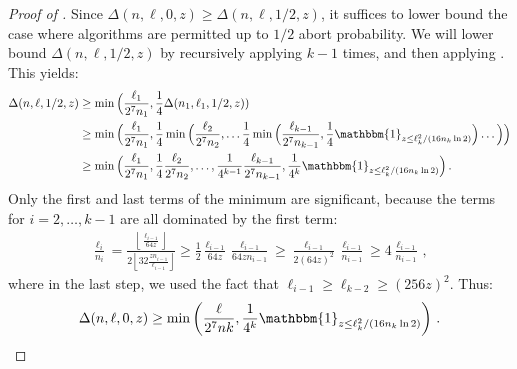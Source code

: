 \documentclass[10pt,a4paper]{article}
\theoremstyle{definition}
\theoremstyle{remark}
\newcommand{\indic}{\mathbbm{1}}
\newcommand{\floor}[1]{{\left\lfloor{#1}\right\rfloor}}
\newcommand{\rl}{\mathbf{\ell}}             %
\newcommand{\Mstk}{\Delta}                  %
\begin{document}
\begin{itemize}
\begin{itemize}
\begin{proof}[Proof of ]
  Since $\Mstk(n,\rl,0,z) \ge \Mstk(n,\rl,1/2,z)$, it suffices to lower bound the case where algorithms are permitted up to $1/2$ abort probability. We will lower bound $\Mstk(n,\rl,1/2,z)$ by recursively applying
   $k-1$ times, and then applying
  . This yields:
  \begin{align*}
    \Mstk(n,\rl,1/2,z) &\ge \min\Big(\frac{\rl_1}{2^7 n_1}, \frac{1}{4} \Mstk(n_1,\rl_1,1/2,z)) \\
      &\ge \min\Big(\frac{\rl_1}{2^7 n_1}, \frac{1}{4} \min\Big(\frac{\rl_2}{2^7 n_2}, \ldots \frac{1}{4} \min\Big(\frac{\rl_{k-1}}{2^7 n_{k-1}},  \frac{1}{4} \indic_{z \le \rl_k^2 / (16 n_k \ln 2)} \Big)\ldots\Big)\Big) \\
      &\ge \min\Big(\frac{\rl_1}{2^7 n_1}, \frac{1}{4} \frac{\rl_2}{2^7 n_2},
      \ldots, \frac{1}{4^{k-1}} \frac{\rl_{k-1}}{2^7 n_{k-1}}, \frac{1}{4^k} \indic_{z \le \rl_k^2 / (16 n_k \ln 2)} \Big) \,.
  \end{align*}
  Only the first and last terms of the minimum are significant, because the terms for $i = 2,\ldots,{k-1}$ are all dominated by the first term:
  \begin{align*}
    \frac{\rl_i}{n_i} = \frac{\floor{\frac{\rl_{i-1}}{64 z} }}{2 \floor{32 \frac{z n_{i-1}}{\rl_{i-1}} } } \ge \frac{1}{2} \frac{\rl_{i-1}}{64 z} \frac{\rl_{i-1}}{64 z n_{i-1}} \ge \frac{\rl_{i-1}}{2 (64 z)^2} \frac{\rl_{i-1}}{n_{i-1}} \ge 4 \frac{\rl_{i-1}}{n_{i-1}} \,,
  \end{align*}
  where in the last step, we used the fact that $\rl_{i-1} \ge \rl_{k-2} \ge (256 z)^2$. Thus:
  \begin{align*}
    \Mstk(n,\rl,0,z) \ge \min\left(\frac{\rl}{2^{7} n k}, \frac{1}{4^k} \indic_{z \le \rl_k^2 / (16 n_k \ln 2)} \right) \,.
  \end{align*}
  

\end{proof}
\end{itemize}
\end{itemize}
\end{document}
